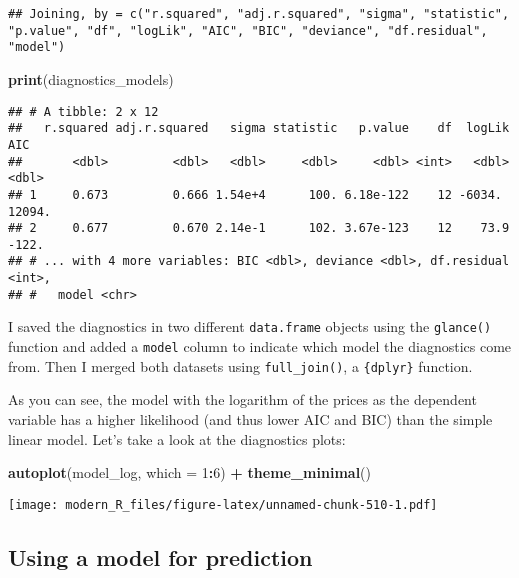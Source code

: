 \documentclass[
]{article}
\newenvironment{Shaded}{\begin{snugshade}}{\end{snugshade}}
\newcommand{\DataTypeTok}[1]{\textcolor[rgb]{0.13,0.29,0.53}{#1}}
\newcommand{\DecValTok}[1]{\textcolor[rgb]{0.00,0.00,0.81}{#1}}
\newcommand{\KeywordTok}[1]{\textcolor[rgb]{0.13,0.29,0.53}{\textbf{#1}}}
\newcommand{\NormalTok}[1]{#1}
\newcommand{\OperatorTok}[1]{\textcolor[rgb]{0.81,0.36,0.00}{\textbf{#1}}}
\newcommand{\StringTok}[1]{\textcolor[rgb]{0.31,0.60,0.02}{#1}}
\begin{document}
\begin{verbatim}
## Joining, by = c("r.squared", "adj.r.squared", "sigma", "statistic", "p.value", "df", "logLik", "AIC", "BIC", "deviance", "df.residual", "model")
\end{verbatim}

\begin{Shaded}
\begin{Highlighting}[]
\KeywordTok{print}\NormalTok{(diagnostics\_models)}
\end{Highlighting}
\end{Shaded}

\begin{verbatim}
## # A tibble: 2 x 12
##   r.squared adj.r.squared   sigma statistic   p.value    df  logLik    AIC
##       <dbl>         <dbl>   <dbl>     <dbl>     <dbl> <int>   <dbl>  <dbl>
## 1     0.673         0.666 1.54e+4      100. 6.18e-122    12 -6034.  12094.
## 2     0.677         0.670 2.14e-1      102. 3.67e-123    12    73.9  -122.
## # ... with 4 more variables: BIC <dbl>, deviance <dbl>, df.residual <int>,
## #   model <chr>
\end{verbatim}

I saved the diagnostics in two different \texttt{data.frame} objects using the \texttt{glance()} function and added a
\texttt{model} column to indicate which model the diagnostics come from. Then I merged both datasets using
\texttt{full\_join()}, a \texttt{\{dplyr\}} function.

As you can see, the model with the logarithm of the prices as the dependent variable has a higher
likelihood (and thus lower AIC and BIC) than the simple linear model. Let's take a look at the
diagnostics plots:

\begin{Shaded}
\begin{Highlighting}[]
\KeywordTok{autoplot}\NormalTok{(model\_log, }\DataTypeTok{which =} \DecValTok{1}\OperatorTok{:}\DecValTok{6}\NormalTok{) }\OperatorTok{+}\StringTok{ }\KeywordTok{theme\_minimal}\NormalTok{()}
\end{Highlighting}
\end{Shaded}

\texttt{[image: modern\_R\_files/figure-latex/unnamed-chunk-510-1.pdf]}

\hypertarget{using-a-model-for-prediction}{%
\subsection{Using a model for prediction}\label{using-a-model-for-prediction}}
\end{document}

